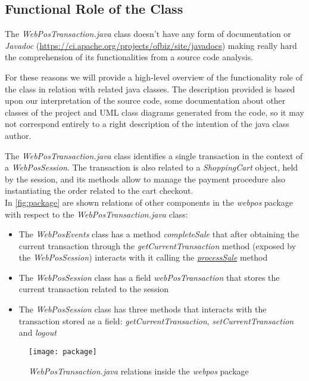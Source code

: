 \subsection{Functional Role of the Class}
The \emph{WebPosTransaction.java} class doesn't have any form of documentation or \emph{Javadoc} (\url{https://ci.apache.org/projects/ofbiz/site/javadocs}) making really hard the comprehension of its functionalities from a source code analysis.

For these reasons we will provide a high-level overview of the functionality role of the class in relation with related java classes. The description provided is based upon our interpretation of the source code, some documentation about other classes of the project and UML class diagrams generated from the code, so it may not correspond entirely to a right description of the intention of the java class author.\\

\clearpage

The \emph{WebPosTransaction.java} class identifies a single transaction in the context of a \emph{WebPosSession}. The transaction is also related to a \emph{ShoppingCart} object, held by the session, and its methods allow to manage the payment procedure also instantiating the order related to the cart checkout. \\

In \autoref{fig:package} are shown relations of other components in the \emph{webpos} package with respect to the \emph{WebPosTransaction.java} class:
\begin{itemize}
	\item The \emph{WebPosEvents} class has a method \emph{completeSale} that after obtaining the current transaction through the \emph{getCurrentTransaction} method (exposed by the \emph{WebPosSession}) interacts with it calling the \hyperref[method:processSale]{\emph{processSale}} method
	\item The \emph{WebPosSession} class has a field \emph{webPosTransaction} that stores the current transaction related to the session
	\item The \emph{WebPosSession} class has three methods that interacts with the transaction stored as a field: \emph{getCurrentTransaction}, \emph{setCurrentTransaction} and \emph{logout}
\end{itemize}

\begin{figure}[h]
			\centering
			\texttt{[image: package]}
			\caption{
				\label{fig:package} 
				\emph{WebPosTransaction.java} relations inside the \emph{webpos} package
			}
\end{figure}

